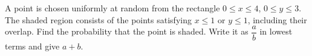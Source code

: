 A point is chosen uniformly at random from the rectangle $0\le x\le4$, $0\le y\le3$. The shaded region consists of the points satisfying $x\le1$ or $y\le1$, including their overlap. Find the probability that the point is shaded. Write it as $\dfrac{a}{b}$ in lowest terms and give $a+b$.

